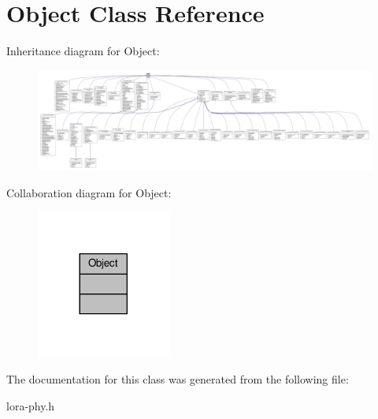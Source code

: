\hypertarget{classObject}{}\section{Object Class Reference}
\label{classObject}


Inheritance diagram for Object\+:
\nopagebreak
\begin{figure}[H]
\begin{center}
\leavevmode
\includegraphics[width=350pt]{classObject__inherit__graph}
\end{center}
\end{figure}


Collaboration diagram for Object\+:
\nopagebreak
\begin{figure}[H]
\begin{center}
\leavevmode
\includegraphics[width=125pt]{classObject__coll__graph}
\end{center}
\end{figure}


The documentation for this class was generated from the following file\+:\begin{DoxyCompactItemize}
\item 
lora-\/phy.\+h\end{DoxyCompactItemize}

